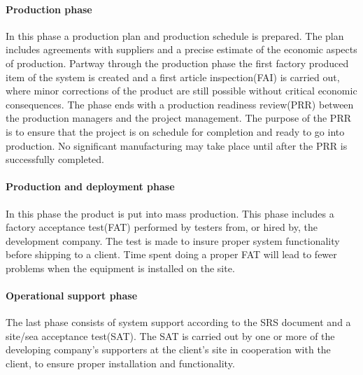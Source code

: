 \paragraph{Production phase}
In this phase a production plan and production schedule is prepared. The plan includes agreements with suppliers and a precise estimate of the economic aspects of production. Partway through the production phase the first factory produced item of the system is created and a first article inspection(FAI) is carried out, where minor corrections of the product are still possible without critical economic consequences. The phase ends with a production readiness review(PRR) between the production managers and the project management. The purpose of the PRR is to ensure that the project is on schedule for completion and ready to
go into production. No significant manufacturing may take place until after the PRR is successfully completed.


\paragraph{Production and deployment phase}
In this phase the product is put into mass production. This phase includes a factory acceptance test(FAT) performed by testers from, or hired by, the development company. The test is made to insure proper system functionality before shipping to a client. Time spent doing a proper FAT will lead to fewer problems when the equipment is installed on the site.


\paragraph{Operational support phase}
The last phase consists of system support according to the SRS document and a site/sea acceptance test(SAT). The SAT is carried out by one or more of the developing company's supporters at the client's site in cooperation with the client, to ensure proper installation and functionality. 
